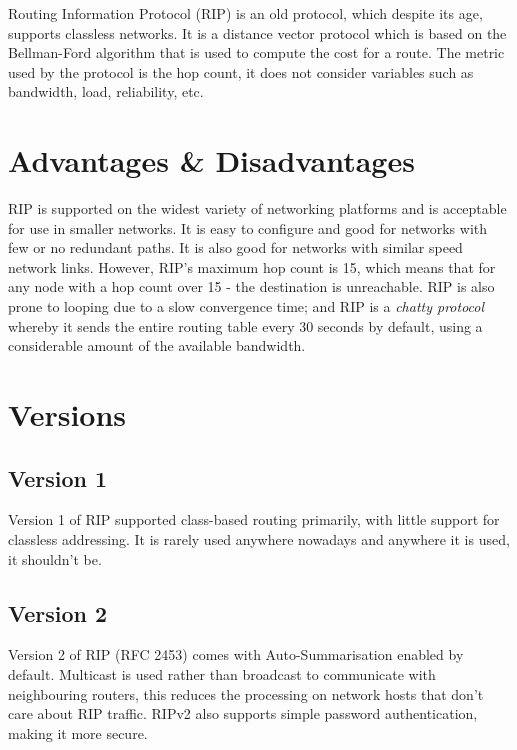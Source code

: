 
Routing Information Protocol (RIP) is an old protocol, which despite its age, supports classless networks. It is a distance vector protocol which is based on the Bellman-Ford algorithm that is used to compute the cost for a route. The metric used by the protocol is the hop count, it does not consider variables such as bandwidth, load, reliability, etc.

\section{Advantages \& Disadvantages}
RIP is supported on the widest variety of networking platforms and is acceptable for use in smaller networks. It is easy to configure and good for networks with few or no redundant paths. It is also good for networks with similar speed network links. However, RIP's maximum hop count is 15, which means that for any node with a hop count over 15 - the destination is unreachable. RIP is also prone to looping due to a slow convergence time; and RIP is a \textit{chatty protocol} whereby it sends the entire routing table every 30 seconds by default, using a considerable amount of the available bandwidth. 

\section{Versions}
\subsection{Version 1}
Version 1 of RIP supported class-based routing primarily, with little support for classless addressing. It is rarely used anywhere nowadays and anywhere it is used, it shouldn't be.
\subsection{Version 2}
Version 2 of RIP (RFC 2453) comes with Auto-Summarisation enabled by default. Multicast is used rather than broadcast to communicate with neighbouring routers, this reduces the processing on network hosts that don't care about RIP traffic. RIPv2 also supports simple password authentication, making it more secure.

